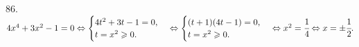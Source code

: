86. $4x^4+3x^2-1=0\Leftrightarrow\begin{cases}4t^2+3t-1=0,\\ t=x^2\geqslant0.\end{cases}\Leftrightarrow\begin{cases}(t+1)(4t-1)=0,\\ t=x^2\geqslant0.\end{cases}
\Leftrightarrow x^2=\cfrac{1}{4} \Leftrightarrow x=\pm\cfrac{1}{2}.$\\
